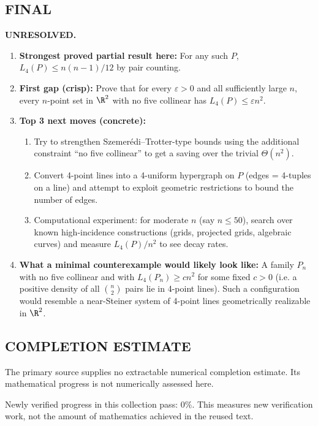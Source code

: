 \subsection*{FINAL}
\textbf{UNRESOLVED.}
\begin{enumerate}[label=(\roman*),leftmargin=2.5em]
\item \textbf{Strongest proved partial result here:}
For any such $P$, $L_4(P)\le n(n-1)/12$ by pair counting.
\item \textbf{First gap (crisp):}
Prove that for every $\varepsilon>0$ and all sufficiently large $n$, every $n$-point set in $\R^2$ with no five collinear has $L_4(P)\le \varepsilon n^2$.
\item \textbf{Top 3 next moves (concrete):}
\begin{enumerate}[label=(\alph*),leftmargin=2.5em]
\item Try to strengthen Szemer\'edi--Trotter-type bounds using the additional constraint ``no five collinear'' to get a saving over the trivial $\Theta(n^2)$.
\item Convert 4-point lines into a 4-uniform hypergraph on $P$ (edges = 4-tuples on a line) and attempt to exploit geometric restrictions to bound the number of edges.
\item Computational experiment: for moderate $n$ (say $n\le 50$), search over known high-incidence constructions (grids, projected grids, algebraic curves) and measure $L_4(P)/n^2$ to see decay rates.
\end{enumerate}
\item \textbf{What a minimal counterexample would likely look like:}
A family $P_n$ with no five collinear and with $L_4(P_n)\ge c n^2$ for some fixed $c>0$ (i.e. a positive density of all $\binom{n}{2}$ pairs lie in 4-point lines). Such a configuration would resemble a near-Steiner system of 4-point lines geometrically realizable in $\R^2$.
\end{enumerate}



\subsection*{COMPLETION ESTIMATE}
The primary source supplies no extractable numerical completion estimate. Its mathematical progress is not numerically assessed here.

Newly verified progress in this collection pass: $0\%$. This measures new verification work, not the amount of mathematics achieved in the reused text.
